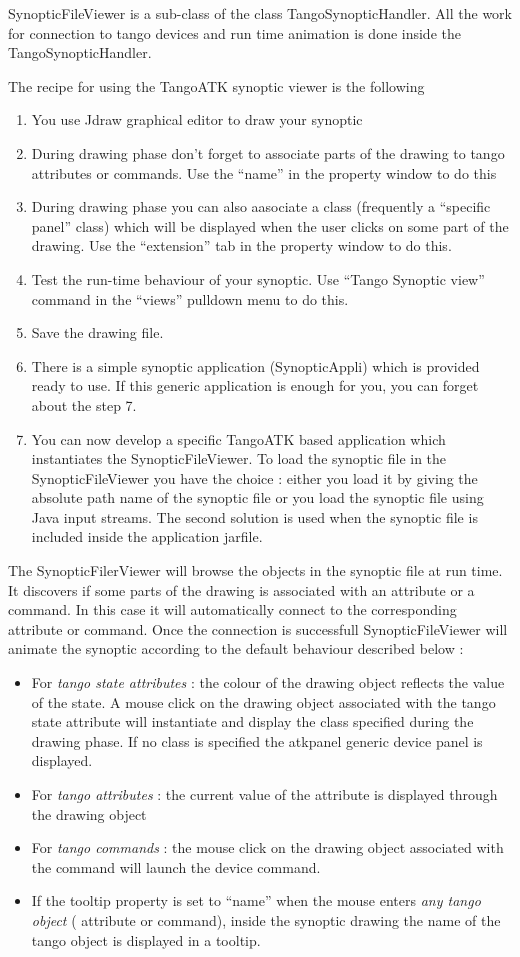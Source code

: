 SynopticFileViewer is a sub-class of the class TangoSynopticHandler.
All the work for connection to tango devices and run time animation
is done inside the TangoSynopticHandler.

The recipe for using the TangoATK synoptic viewer is the following
\begin{enumerate}
\item You use Jdraw graphical editor to draw your synoptic 
\item During drawing phase don't forget to associate parts of the drawing
to tango attributes or commands. Use the ``name'' in the property
window to do this
\item During drawing phase you can also aasociate a class (frequently a
``specific panel'' class) which will be displayed when the user
clicks on some part of the drawing. Use the ``extension'' tab in
the property window to do this.
\item Test the run-time behaviour of your synoptic. Use ``Tango Synoptic
view'' command in the ``views'' pulldown menu to do this.
\item Save the drawing file.
\item There is a simple synoptic application (SynopticAppli) which is provided
ready to use. If this generic application is enough for you, you can
forget about the step 7.
\item You can now develop a specific TangoATK based application which instantiates
the SynopticFileViewer. To load the synoptic file in the SynopticFileViewer
you have the choice : either you load it by giving the absolute path
name of the synoptic file or you load the synoptic file using Java
input streams. The second solution is used when the synoptic file
is included inside the application jarfile.
\end{enumerate}
The SynopticFilerViewer will browse the objects in the synoptic file
at run time. It discovers if some parts of the drawing is associated
with an attribute or a command. In this case it will automatically
connect to the corresponding attribute or command. Once the connection
is successfull SynopticFileViewer will animate the synoptic according
to the default behaviour described below :
\begin{itemize}
\item For \emph{tango state attributes} : the colour of the drawing object
reflects the value of the state. A mouse click on the drawing object
associated with the tango state attribute will instantiate and display
the class specified during the drawing phase. If no class is specified
the atkpanel generic device panel is displayed.
\item For \emph{tango attributes} : the current value
of the attribute is displayed through the drawing object
\item For \emph{tango commands} : the mouse click on the
drawing object associated with the command will launch the device
command.
\item If the tooltip property is set to ``name'' when
the mouse enters \emph{any tango object} ( attribute or command),
inside the synoptic drawing the name of the tango object is displayed
in a tooltip.
\end{itemize}
